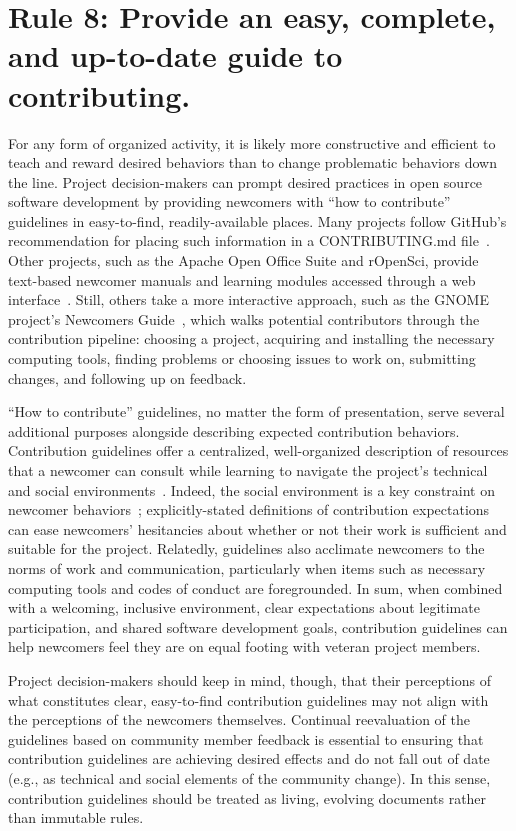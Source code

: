 \documentclass[10pt,letterpaper]{article}
\newcommand{\rulemajor}[1]{\section*{#1}}
\begin{document}
\rulemajor{Rule 8: Provide an easy, complete, and up-to-date guide to contributing.}

For any form of organized activity,
it is likely more constructive and efficient to teach and reward desired behaviors than to change problematic behaviors down the line.
Project decision-makers can prompt desired practices in open source software development
by providing newcomers with ``how to contribute'' guidelines in easy-to-find, readily-available places.
Many projects follow GitHub's recommendation for placing such information in a CONTRIBUTING.md file~\cite{github-rec}.
Other projects,
such as the Apache Open Office Suite and rOpenSci,
provide text-based newcomer manuals and learning modules accessed through a web interface~\cite{apache-guidelines,ropensci-guidelines}.
Still, others take a more interactive approach,
such as the GNOME project's Newcomers Guide~\cite{gnome-newcomers},
which walks potential contributors through the contribution pipeline:
choosing a project,
acquiring and installing the necessary computing tools,
finding problems or choosing issues to work on,
submitting changes,
and following up on feedback.

``How to contribute'' guidelines,
no matter the form of presentation,
serve several additional purposes alongside describing expected contribution behaviors.
Contribution guidelines offer a centralized, well-organized description of resources
that a newcomer can consult while learning to navigate the project's technical and social environments~\cite{zanatta2017}.
Indeed, the social environment is a key constraint on newcomer behaviors~\cite{steinmacher2015};
explicitly-stated definitions of contribution expectations can ease newcomers' hesitancies
about whether or not their work is sufficient and suitable for the project.
Relatedly,
guidelines also acclimate newcomers to the norms of work and communication,
particularly when items such as necessary computing tools and codes of conduct are foregrounded.
In sum,
when combined with a welcoming, inclusive environment,
clear expectations about legitimate participation,
and shared software development goals,
contribution guidelines can help newcomers feel they are on equal footing with veteran project members.

Project decision-makers should keep in mind,
though,
that their perceptions of what constitutes clear, easy-to-find contribution guidelines
may not align with the perceptions of the newcomers themselves.
Continual reevaluation of the guidelines based on community member feedback is essential
to ensuring that contribution guidelines are achieving desired effects
and do not fall out of date (e.g., as technical and social elements of the community change).
In this sense,
contribution guidelines should be treated as living, evolving documents rather than immutable rules.
\end{document}
